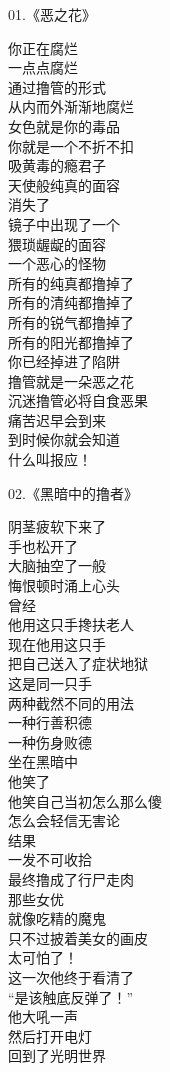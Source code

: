 \documentclass{ctexart}
\begin{document}
\begin{multicols}{2}
    \begin{center}
        01.《恶之花》\it

        你正在腐烂 \\ 一点点腐烂 \\ 通过撸管的形式 \\ 从内而外渐渐地腐烂 \\ 女色就是你的毒品 \\ 你就是一个不折不扣 \\ 吸黄毒的瘾君子 \\ 天使般纯真的面容 \\ 消失了 \\ 镜子中出现了一个 \\ 猥琐龌龊的面容 \\ 一个恶心的怪物 \\ 所有的纯真都撸掉了 \\ 所有的清纯都撸掉了 \\ 所有的锐气都撸掉了 \\ 所有的阳光都撸掉了 \\ 你已经掉进了陷阱 \\ 撸管就是一朵恶之花 \\ 沉迷撸管必将自食恶果 \\ 痛苦迟早会到来 \\ 到时候你就会知道 \\ 什么叫报应！
    \end{center}

    \begin{center}
        02.《黑暗中的撸者》\it

        阴茎疲软下来了 \\ 手也松开了 \\ 大脑抽空了一般 \\ 悔恨顿时涌上心头 \\ 曾经 \\ 他用这只手搀扶老人 \\ 现在他用这只手 \\ 把自己送入了症状地狱 \\ 这是同一只手 \\ 两种截然不同的用法 \\ 一种行善积德 \\ 一种伤身败德 \\ 坐在黑暗中 \\ 他笑了 \\ 他笑自己当初怎么那么傻 \\ 怎么会轻信无害论 \\ 结果 \\ 一发不可收拾 \\ 最终撸成了行尸走肉 \\ 那些女优 \\ 就像吃精的魔鬼 \\ 只不过披着美女的画皮 \\ 太可怕了！ \\ 这一次他终于看清了 \\ “是该触底反弹了！” \\ 他大吼一声 \\ 然后打开电灯 \\ 回到了光明世界
    \end{center}


\end{multicols}
\end{document}
